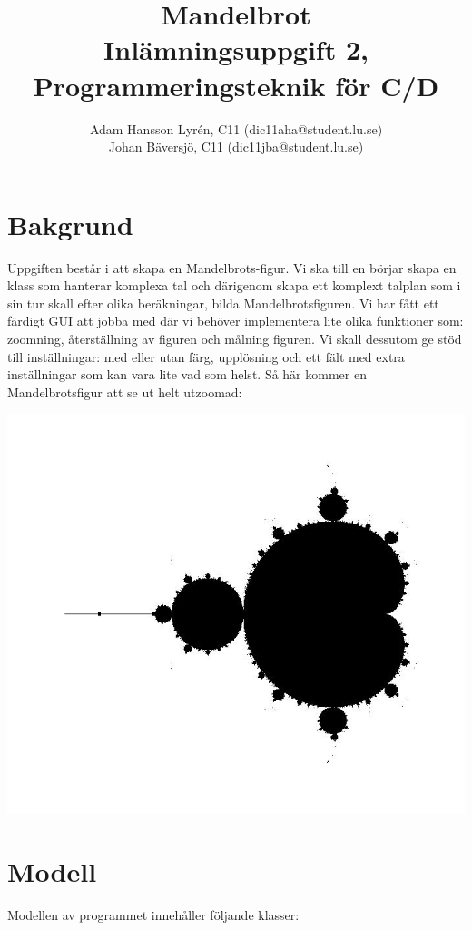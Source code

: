 \documentclass[a4paper]{article}
\title{Mandelbrot \\
	Inlämningsuppgift 2, Programmeringsteknik för C/D}
\author{Adam Hansson Lyrén, C11 (dic11aha@student.lu.se)\\
Johan Bäversjö, C11 (dic11jba@student.lu.se)}
\begin{document}

\maketitle
\thispagestyle{empty}
\newpage
\setcounter{page}{1}
\section{Bakgrund}
Uppgiften består i att skapa en Mandelbrots-figur. Vi ska till en börjar skapa en klass som hanterar komplexa tal och därigenom skapa ett komplext talplan som i sin tur skall efter olika beräkningar, bilda Mandelbrotsfiguren. Vi har fått ett färdigt GUI att jobba med där vi behöver implementera lite olika funktioner som: zoomning, återställning av figuren och målning figuren.
\newline
Vi skall dessutom ge stöd till inställningar: med eller utan färg, upplösning och ett fält med extra inställningar som kan vara lite vad som helst.
\newline
\newline
Så här kommer en Mandelbrotsfigur att se ut helt utzoomad:
\begin{center}
\includegraphics[scale=0.29]{mandelbrot_print_1.jpg}
\end{center}
 
\section{Modell}
Modellen av programmet innehåller följande klasser:
\end{document}

